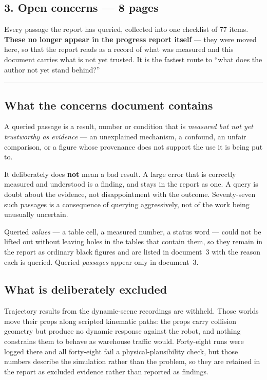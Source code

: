 \documentclass[11pt,a4paper]{article}
\begin{document}
\subsection*{3. Open concerns --- 8 pages}

Every passage the report has queried, collected into one checklist of 77 items.
\textbf{These no longer appear in the progress report itself} --- they were moved
here, so that the report reads as a record of what was measured and this document
carries what is not yet trusted. It is the fastest route to ``what does the author
not yet stand behind?''

\bigskip
\hrule
\bigskip

\subsection*{What the concerns document contains}

A queried passage is a result, number or condition that is \emph{measured but not
yet trustworthy as evidence} --- an unexplained mechanism, a confound, an unfair
comparison, or a figure whose provenance does not support the use it is being put
to.

It deliberately does \textbf{not} mean a bad result. A large error that is
correctly measured and understood is a finding, and stays in the report as one.
A query is doubt about the evidence, not disappointment with the outcome.
Seventy-seven such passages is a consequence of querying aggressively, not of the
work being unusually uncertain.

Queried \emph{values} --- a table cell, a measured number, a status word --- could
not be lifted out without leaving holes in the tables that contain them, so they
remain in the report as ordinary black figures and are listed in document~3 with
the reason each is queried. Queried \emph{passages} appear only in document~3.

\subsection*{What is deliberately excluded}

Trajectory results from the dynamic-scene recordings are withheld. Those worlds
move their props along scripted kinematic paths: the props carry collision
geometry but produce no dynamic response against the robot, and nothing
constrains them to behave as warehouse traffic would. Forty-eight runs were
logged there and all forty-eight fail a physical-plausibility check, but those
numbers describe the simulation rather than the problem, so they are retained in
the report as excluded evidence rather than reported as findings.
\end{document}
